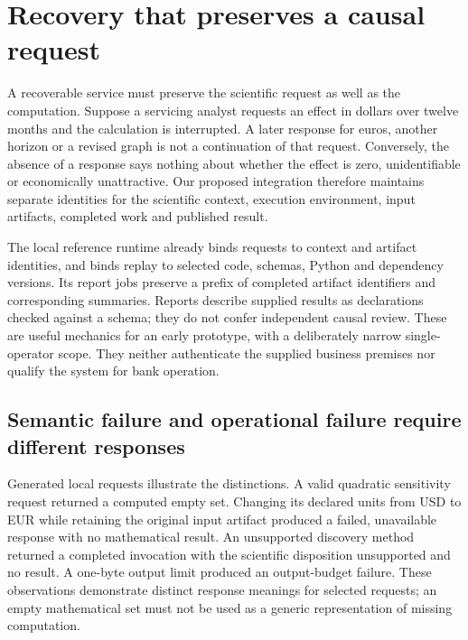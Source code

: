 \section{Recovery that preserves a causal request}
\label{exec14:failure-trials}

A recoverable service must preserve the scientific request as well as the
computation. Suppose a servicing analyst requests an effect in dollars over
twelve months and the calculation is interrupted. A later response for euros,
another horizon or a revised graph is not a continuation of that request.
Conversely, the absence of a response says nothing about whether the effect is
zero, unidentifiable or economically unattractive. Our proposed integration
therefore maintains separate identities for the scientific context, execution
environment, input artifacts, completed work and published result.
\citep{exec14_failure_design}

The local reference runtime already binds requests to context and artifact
identities, and binds replay to selected code, schemas, Python and dependency
versions. Its report jobs preserve a prefix of completed artifact identifiers
and corresponding summaries. Reports describe supplied results as declarations
checked against a schema; they do not confer independent causal review. These
are useful mechanics for an early prototype, with a deliberately narrow
single-operator scope. They neither authenticate the supplied business premises
nor qualify the system for bank operation. \citep{exec14_failure_implementation}

\subsection{Semantic failure and operational failure require different responses}

Generated local requests illustrate the distinctions. A valid quadratic
sensitivity request returned a computed empty set. Changing its declared units
from USD to EUR while retaining the original input artifact produced a failed,
unavailable response with no mathematical result. An unsupported discovery
method returned a completed invocation with the scientific disposition
unsupported and no result. A one-byte output limit produced an output-budget
failure. These observations demonstrate distinct response meanings for selected
requests; an empty mathematical set must not be used as a generic representation
of missing computation. \citep{exec14_failure_observations}

